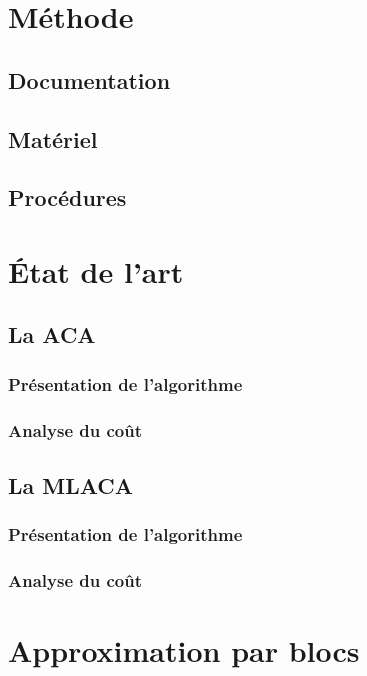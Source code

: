 \documentclass[fleqn,10pt]{SelfArx} %
\begin{document}

\section{Méthode}
\subsection{Documentation}
\subsection{Matériel}
\subsection{Procédures}



\section{État de l'art}
\subsection{La ACA}
\subsubsection{Présentation de l'algorithme}
\subsubsection{Analyse du coût}
\subsection{La MLACA}
\subsubsection{Présentation de l'algorithme}
\subsubsection{Analyse du coût}



\section{Approximation par blocs}
\end{document}
